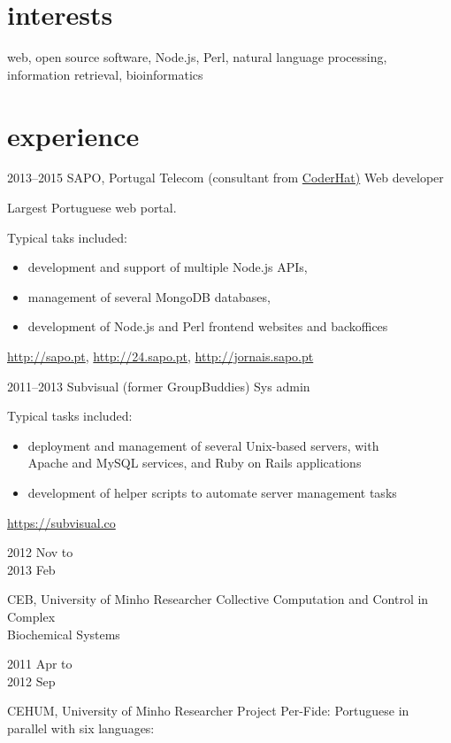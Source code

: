 \documentclass[a4paper]{friggeri-cv}
\begin{document}
\section{interests}

{\large{web, open source software, Node.js, Perl, natural language
processing, information retrieval, bioinformatics}}

\section{experience}
\begin{entrylist}
  \entry
    {2013--2015}
    {SAPO, Portugal Telecom (consultant from \href{http://www.coderhat.com/}{CoderHat)}}
    {Web developer}
    {Largest Portuguese web portal. \footnotesize{Typical taks included:
        \begin{itemize}
            \item development and support of multiple Node.js APIs,
            \item management of several MongoDB databases,
            \item development of Node.js and Perl frontend websites and backoffices
        \end{itemize}
        \url{http://sapo.pt}, \url{http://24.sapo.pt}, \url{http://jornais.sapo.pt}
        }
    }
  \entry
    {2011--2013}
    {Subvisual (former GroupBuddies)}
    {Sys admin}
    {
    \footnotesize{Typical tasks included:
        \begin{itemize}
            \item deployment and management of several Unix-based
            servers, with\\
            Apache and MySQL services, and Ruby on Rails applications
            \item development of helper scripts to automate
            server management tasks
            \end{itemize}
        \url{https://subvisual.co}
        }
    }
  \entry
    {\parbox[t][][t]{1.8cm}{2012 {\footnotesize Nov to}\\2013 {\footnotesize Feb}}}
    {CEB, University of Minho}
    {Researcher}
    {Collective Computation and Control in Complex\\
    Biochemical Systems}
  \entry
    {\parbox[t][][t]{1.8cm}{2011 {\footnotesize Apr to}\\2012 {\footnotesize Sep}}}
    {CEHUM, University of Minho}
    {Researcher}
    {Project Per-Fide: Portuguese in parallel with six languages:\\
}
\end{entrylist}
\end{document}
